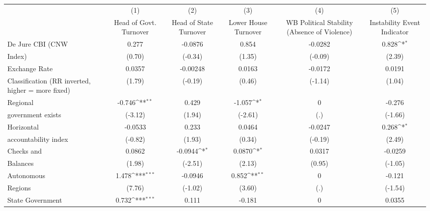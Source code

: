 {
\def\sym#1{\ifmmode^{#1}\else\(^{#1}\)\fi}
\begin{tabular}{l*{5}{c}}
\toprule
                &\multicolumn{1}{c}{(1)}&\multicolumn{1}{c}{(2)}&\multicolumn{1}{c}{(3)}&\multicolumn{1}{c}{(4)}&\multicolumn{1}{c}{(5)}\\
                &\multicolumn{1}{c}{Head of Govt. Turnover}&\multicolumn{1}{c}{Head of State Turnover}&\multicolumn{1}{c}{Lower House Turnover}&\multicolumn{1}{c}{WB Political Stability (Absence of Violence)}&\multicolumn{1}{c}{Instability Event Indicator}\\
\midrule
De Jure CBI (CNW&    0.277         &  -0.0876         &    0.854         &  -0.0282         &    0.828\sym{*}  \\
Index)          &   (0.70)         &  (-0.34)         &   (1.35)         &  (-0.09)         &   (2.39)         \\
\addlinespace
Exchange Rate   &   0.0357         & -0.00248         &   0.0163         &  -0.0172         &   0.0191         \\
Classification (RR inverted, higher = more fixed)&   (1.79)         &  (-0.19)         &   (0.46)         &  (-1.14)         &   (1.04)         \\
\addlinespace
Regional        &   -0.746\sym{**} &    0.429         &   -1.057\sym{*}  &        0         &   -0.276         \\
government exists   &  (-3.12)         &   (1.94)         &  (-2.61)         &      (.)         &  (-1.66)         \\
\addlinespace
Horizontal      &  -0.0533         &    0.233         &   0.0464         &  -0.0247         &    0.268\sym{*}  \\
accountability index&  (-0.82)         &   (1.93)         &   (0.34)         &  (-0.19)         &   (2.49)         \\
\addlinespace
Checks and      &   0.0862         &  -0.0944\sym{*}  &   0.0870\sym{*}  &   0.0317         &  -0.0259         \\
Balances        &   (1.98)         &  (-2.51)         &   (2.13)         &   (0.95)         &  (-1.05)         \\
\addlinespace
Autonomous      &    1.478\sym{***}&  -0.0946         &    0.852\sym{**} &        0         &   -0.121         \\
Regions         &   (7.76)         &  (-1.02)         &   (3.60)         &      (.)         &  (-1.54)         \\
\addlinespace
State Government&    0.732\sym{***}&    0.111         &   -0.181         &        0         &   0.0355         \\

\end{tabular}}
